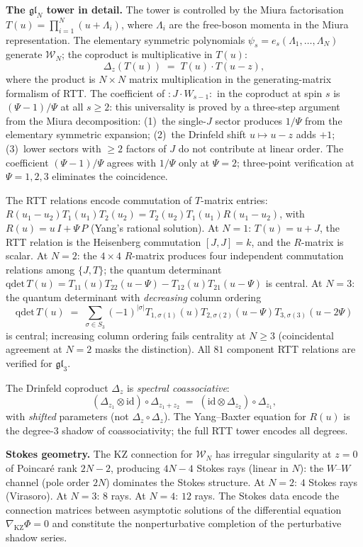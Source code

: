 \documentclass[11pt,reqno]{amsart}
\theoremstyle{definition}
\theoremstyle{remark}
\providecommand{\cW}{\mathcal{W}}
\providecommand{\KZ}{\mathrm{KZ}}
\providecommand{\id}{\mathrm{id}}
\numberwithin{equation}{section}
\begin{document}
\medskip\noindent\textbf{The $\mathfrak{gl}_N$ tower in detail.}\enspace
The tower is controlled by the Miura factorisation
$T(u) = \prod_{i=1}^N (u + \Lambda_i)$, where $\Lambda_i$ are
the free-boson momenta in the Miura representation. The elementary
symmetric polynomials $\psi_s = e_s(\Lambda_1, \ldots, \Lambda_N)$
generate $\cW_N$; the coproduct is multiplicative in $T(u)$:
\[
\Delta_z(T(u)) \;=\; T(u) \cdot T(u - z),
\]
where the product is $N \times N$ matrix multiplication in the
generating-matrix formalism of RTT. The coefficient of
$:J \cdot W_{s-1}:$ in the coproduct at spin $s$ is
$(\Psi - 1)/\Psi$ at all $s \ge 2$: this universality is
proved by a three-step argument from the Miura decomposition:
(1)~the single-$J$ sector produces $1/\Psi$ from the elementary
symmetric expansion; (2)~the Drinfeld shift $u \mapsto u - z$
adds $+1$; (3)~lower sectors with $\ge 2$ factors of $J$ do not
contribute at linear order. The coefficient
$(\Psi - 1)/\Psi$ agrees with $1/\Psi$ only at $\Psi = 2$;
three-point verification at $\Psi = 1, 2, 3$ eliminates the
coincidence.

The RTT relations encode commutation of $T$-matrix entries:
$R(u_1 - u_2) T_1(u_1) T_2(u_2) = T_2(u_2) T_1(u_1) R(u_1 - u_2)$,
with $R(u) = u\,I + \Psi\,P$ (Yang's rational solution). At $N = 1$:
$T(u) = u + J$, the RTT relation is the Heisenberg commutation
$[J, J] = k$, and the $R$-matrix is scalar. At $N = 2$: the
$4 \times 4$ $R$-matrix produces four independent commutation
relations among $\{J, T\}$; the quantum determinant
$\mathrm{qdet}\,T(u) = T_{11}(u)T_{22}(u - \Psi) -
T_{12}(u)T_{21}(u - \Psi)$ is central. At $N = 3$: the quantum
determinant with \emph{decreasing} column ordering
\[
\mathrm{qdet}\,T(u)
\;=\;
\sum_{\sigma \in S_3} (-1)^{|\sigma|}
T_{1,\sigma(1)}(u) T_{2,\sigma(2)}(u - \Psi) T_{3,\sigma(3)}(u - 2\Psi)
\]
is central; increasing column ordering fails centrality at $N \ge 3$
(coincidental agreement at $N = 2$ masks the distinction). All $81$
component RTT relations are verified for $\mathfrak{gl}_3$.

The Drinfeld coproduct $\Delta_z$ is \emph{spectral coassociative}:
\[
(\Delta_{z_1} \otimes \id) \circ \Delta_{z_1 + z_2}
\;=\;
(\id \otimes \Delta_{z_2}) \circ \Delta_{z_1},
\]
with \emph{shifted} parameters (not $\Delta_z \circ \Delta_z$).
The Yang--Baxter equation for $R(u)$ is the degree-$3$ shadow of
coassociativity; the full RTT tower encodes all degrees.

\medskip\noindent\textbf{Stokes geometry.}\enspace
The KZ connection for $\cW_N$ has irregular singularity at $z = 0$
of Poincar\'e rank $2N - 2$, producing $4N - 4$ Stokes rays
(linear in $N$): the $W$--$W$ channel (pole order $2N$) dominates
the Stokes structure. At $N = 2$: $4$ Stokes rays (Virasoro).
At $N = 3$: $8$ rays. At $N = 4$: $12$ rays. The Stokes data
encode the connection matrices between asymptotic solutions of the
differential equation $\nabla_{\KZ}\Phi = 0$ and constitute the
nonperturbative completion of the perturbative shadow series.
\end{document}
